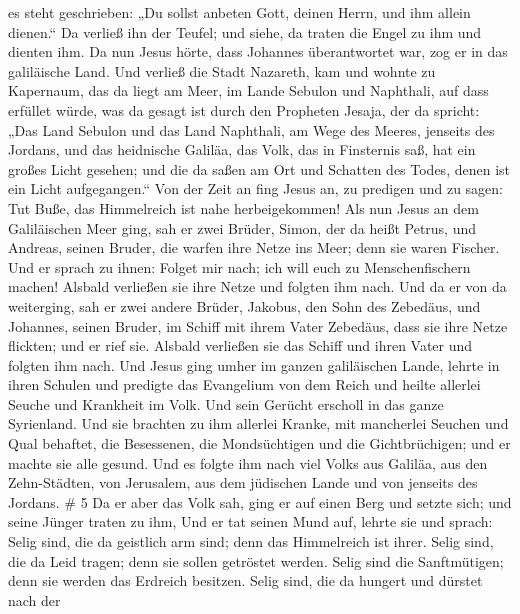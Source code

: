 es steht geschrieben: „Du sollst anbeten Gott, deinen Herrn, und ihm
allein dienen.``  Da verließ ihn der Teufel; und siehe, da
traten die Engel zu ihm und dienten ihm.  Da nun Jesus
hörte, dass Johannes überantwortet war, zog er in das galiläische Land.
 Und verließ die Stadt Nazareth, kam und wohnte zu
Kapernaum, das da liegt am Meer, im Lande Sebulon und Naphthali,
 auf dass erfüllet würde, was da gesagt ist durch den
Propheten Jesaja, der da spricht:  „Das Land Sebulon und
das Land Naphthali, am Wege des Meeres, jenseits des Jordans, und das
heidnische Galiläa,  das Volk, das in Finsternis saß, hat
ein großes Licht gesehen; und die da saßen am Ort und Schatten des
Todes, denen ist ein Licht aufgegangen.``  Von der Zeit an
fing Jesus an, zu predigen und zu sagen: Tut Buße, das Himmelreich ist
nahe herbeigekommen!  Als nun Jesus an dem Galiläischen
Meer ging, sah er zwei Brüder, Simon, der da heißt Petrus, und Andreas,
seinen Bruder, die warfen ihre Netze ins Meer; denn sie waren Fischer.
 Und er sprach zu ihnen: Folget mir nach; ich will euch zu
Menschenfischern machen!  Alsbald verließen sie ihre Netze
und folgten ihm nach.  Und da er von da weiterging, sah er
zwei andere Brüder, Jakobus, den Sohn des Zebedäus, und Johannes, seinen
Bruder, im Schiff mit ihrem Vater Zebedäus, dass sie ihre Netze
flickten; und er rief sie.  Alsbald verließen sie das
Schiff und ihren Vater und folgten ihm nach.  Und Jesus
ging umher im ganzen galiläischen Lande, lehrte in ihren Schulen und
predigte das Evangelium von dem Reich und heilte allerlei Seuche und
Krankheit im Volk.  Und sein Gerücht erscholl in das ganze
Syrienland. Und sie brachten zu ihm allerlei Kranke, mit mancherlei
Seuchen und Qual behaftet, die Besessenen, die Mondsüchtigen und die
Gichtbrüchigen; und er machte sie alle gesund.  Und es
folgte ihm nach viel Volks aus Galiläa, aus den Zehn-Städten, von
Jerusalem, aus dem jüdischen Lande und von jenseits des Jordans. \# 5
 Da er aber das Volk sah, ging er auf einen Berg und setzte
sich; und seine Jünger traten zu ihm,  Und er tat seinen
Mund auf, lehrte sie und sprach:  Selig sind, die da
geistlich arm sind; denn das Himmelreich ist ihrer.  Selig
sind, die da Leid tragen; denn sie sollen getröstet werden. 
Selig sind die Sanftmütigen; denn sie werden das Erdreich besitzen.
 Selig sind, die da hungert und dürstet nach der
